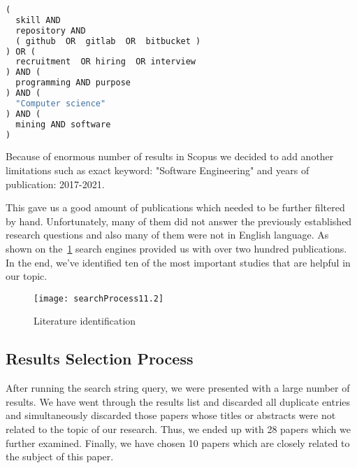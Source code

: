 \documentclass[graybox]{svmult}
\begin{document}
\begin{lstlisting}[language=Python, label={lst:search-string}]
( 
  skill AND
  repository AND
  ( github  OR  gitlab  OR  bitbucket )
) OR (
  recruitment  OR hiring  OR interview
) AND (
  programming AND purpose 
) AND ( 
  "Computer science"
) AND ( 
  mining AND software
)
\end{lstlisting}
Because of enormous number of results in Scopus we decided to add another limitations such as exact keyword: "Software Engineering" and years of publication: 2017-2021.


This gave us a good amount of publications which needed to be further filtered by hand. Unfortunately, many of them did not answer the previously established research questions and also many of them were not in English language. As shown on the~\ref{fig:literature-identification} search engines provided us with over two hundred publications. In the end, we've identified ten of the most important studies that are helpful in our topic.

\begin{figure}[htp]
\centering
\texttt{[image: searchProcess11.2]}
\caption{Literature identification}
\label{fig:literature-identification}
\end{figure}

\subsection{Results Selection Process}
After running the search string query, we were presented with a large number of results. We have went through the results list and discarded all duplicate entries and simultaneously discarded those papers whose titles or abstracts were not related to the topic of our research. Thus, we ended up with 28 papers which we further examined. Finally, we have chosen 10 papers which are closely related to the subject of this paper.
\end{document}

